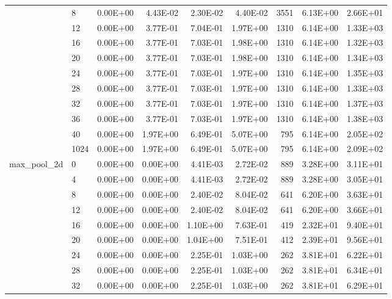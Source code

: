 \begin{longtable}{llrrrrrrr}
         & 8    &   0.00E+00 & 4.43E-02 & 2.30E-02 & 4.40E-02 &    3551 &     6.13E+00 & 2.66E+01 \\
         & 12   &   0.00E+00 & 3.77E-01 & 7.04E-01 & 1.97E+00 &    1310 &     6.14E+00 & 1.33E+03 \\
         & 16   &   0.00E+00 & 3.77E-01 & 7.03E-01 & 1.98E+00 &    1310 &     6.14E+00 & 1.32E+03 \\
         & 20   &   0.00E+00 & 3.77E-01 & 7.03E-01 & 1.98E+00 &    1310 &     6.14E+00 & 1.34E+03 \\
         & 24   &   0.00E+00 & 3.77E-01 & 7.03E-01 & 1.97E+00 &    1310 &     6.14E+00 & 1.35E+03 \\
         & 28   &   0.00E+00 & 3.77E-01 & 7.03E-01 & 1.97E+00 &    1310 &     6.14E+00 & 1.33E+03 \\
         & 32   &   0.00E+00 & 3.77E-01 & 7.03E-01 & 1.97E+00 &    1310 &     6.14E+00 & 1.37E+03 \\
         & 36   &   0.00E+00 & 3.77E-01 & 7.03E-01 & 1.97E+00 &    1310 &     6.14E+00 & 1.38E+03 \\
         & 40   &   0.00E+00 & 1.97E+00 & 6.49E-01 & 5.07E+00 &     795 &     6.14E+00 & 2.05E+02 \\
         & 1024 &   0.00E+00 & 1.97E+00 & 6.49E-01 & 5.07E+00 &     795 &     6.14E+00 & 2.09E+02 \\
max\_pool\_2d & 0    &   0.00E+00 & 0.00E+00 & 4.41E-03 & 2.72E-02 &     889 &     3.28E+00 & 3.11E+01 \\
         & 4    &   0.00E+00 & 0.00E+00 & 4.41E-03 & 2.72E-02 &     889 &     3.28E+00 & 3.05E+01 \\
         & 8    &   0.00E+00 & 0.00E+00 & 2.40E-02 & 8.04E-02 &     641 &     6.20E+00 & 3.63E+01 \\
         & 12   &   0.00E+00 & 0.00E+00 & 2.40E-02 & 8.04E-02 &     641 &     6.20E+00 & 3.66E+01 \\
         & 16   &   0.00E+00 & 0.00E+00 & 1.10E+00 & 7.63E-01 &     419 &     2.32E+01 & 9.40E+01 \\
         & 20   &   0.00E+00 & 0.00E+00 & 1.04E+00 & 7.51E-01 &     412 &     2.39E+01 & 9.56E+01 \\
         & 24   &   0.00E+00 & 0.00E+00 & 2.25E-01 & 1.03E+00 &     262 &     3.81E+01 & 6.22E+01 \\
         & 28   &   0.00E+00 & 0.00E+00 & 2.25E-01 & 1.03E+00 &     262 &     3.81E+01 & 6.34E+01 \\
         & 32   &   0.00E+00 & 0.00E+00 & 2.25E-01 & 1.03E+00 &     262 &     3.81E+01 & 6.29E+01 \\

\end{longtable}
